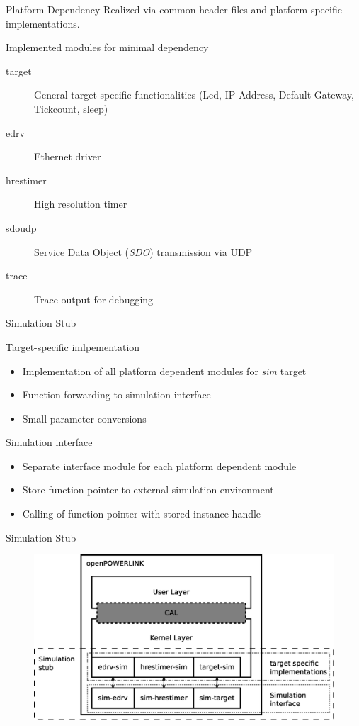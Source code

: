 \begin{frame}{Platform Dependency}
    Realized via common header files and platform specific implementations.
    
    \begin{block}{Implemented modules for minimal dependency}
        \begin{description}
            \item[target] General target specific functionalities (Led, IP Address, Default Gateway, Tickcount, sleep)
            \item[edrv] Ethernet driver
            \item[hrestimer] High resolution timer
            \item[sdoudp] Service Data Object (\emph{SDO}) transmission via UDP
            \item[trace] Trace output for debugging
        \end{description}
    \end{block}
\end{frame}

\begin{frame}{Simulation Stub}
    \begin{block}{Target-specific imlpementation}
        \begin{itemize}
            \item Implementation of all platform dependent modules for \emph{sim} target
            \item Function forwarding to simulation interface
            \item Small parameter conversions
        \end{itemize}
    \end{block}
    \begin{block}{Simulation interface}
        \begin{itemize}
            \item Separate interface module for each platform dependent module
            \item Store function pointer to external simulation environment
            \item Calling of function pointer with stored instance handle
        \end{itemize}
    \end{block}    
\end{frame}

\begin{frame}{Simulation Stub}
    \begin{figure}
        \includegraphics[width=\textwidth]{../../thesis/images/simulation_stub.eps}
    \end{figure}
\end{frame}